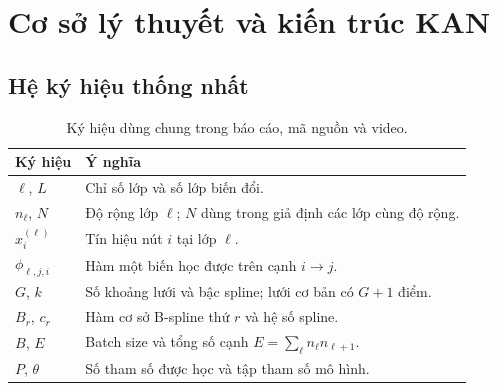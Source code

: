 \chapter{Cơ sở lý thuyết và kiến trúc KAN}
\label{ch:theory}

\section{Hệ ký hiệu thống nhất}
\begin{table}[htbp]\centering\small
\caption{Ký hiệu dùng chung trong báo cáo, mã nguồn và video.}\label{tab:notation}
\begin{tabularx}{\linewidth}{@{}lY@{}}\toprule
\textbf{Ký hiệu} & \textbf{Ý nghĩa}\\\midrule
$\ell$, $L$ & Chỉ số lớp và số lớp biến đổi.\\
$n_\ell$, $N$ & Độ rộng lớp $\ell$; $N$ dùng trong giả định các lớp cùng độ rộng.\\
$x_i^{(\ell)}$ & Tín hiệu nút $i$ tại lớp $\ell$.\\
$\phi_{\ell,j,i}$ & Hàm một biến học được trên cạnh $i\to j$.\\
$G$, $k$ & Số khoảng lưới và bậc spline; lưới cơ bản có $G+1$ điểm.\\
$B_r$, $c_r$ & Hàm cơ sở B-spline thứ $r$ và hệ số spline.\\
$B$, $E$ & Batch size và tổng số cạnh $E=\sum_\ell n_\ell n_{\ell+1}$.\\
$P$, $\theta$ & Số tham số được học và tập tham số mô hình.\\\bottomrule
\end{tabularx}\end{table}

